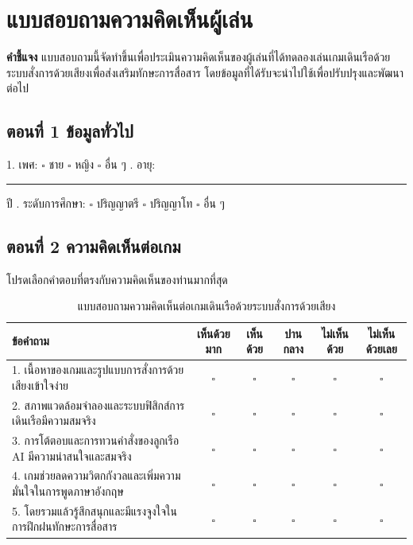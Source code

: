 
\setcounter{chapter}{-1}

\section*{แบบสอบถามความคิดเห็นผู้เล่น}

\textbf{คำชี้แจง} แบบสอบถามนี้จัดทำขึ้นเพื่อประเมินความคิดเห็นของผู้เล่นที่ได้ทดลองเล่นเกมเดินเรือด้วยระบบสั่งการด้วยเสียงเพื่อส่งเสริมทักษะการสื่อสาร โดยข้อมูลที่ได้รับจะนำไปใช้เพื่อปรับปรุงและพัฒนาต่อไป

\subsection*{ตอนที่ 1 ข้อมูลทั่วไป}
1. เพศ: $\square$ ชาย \quad $\square$ หญิง \quad $\square$ อื่น ๆ . อายุ: \rule{2cm}{0.4pt} ปี . ระดับการศึกษา: $\square$ ปริญญาตรี \quad $\square$ ปริญญาโท \quad $\square$ อื่น ๆ

\subsection*{ตอนที่ 2 ความคิดเห็นต่อเกม}
โปรดเลือกคำตอบที่ตรงกับความคิดเห็นของท่านมากที่สุด

\begin{table}[H]
\centering
\caption{แบบสอบถามความคิดเห็นต่อเกมเดินเรือด้วยระบบสั่งการด้วยเสียง}
\label{tab:survey_game}
\small
\begin{tabular}{|p{5cm}|c|c|c|c|c|}
\hline
\textbf{ข้อคำถาม} & \textbf{เห็นด้วยมาก} & \textbf{เห็นด้วย} & \textbf{ปานกลาง} & \textbf{ไม่เห็นด้วย} & \textbf{ไม่เห็นด้วยเลย} \\ \hline
1. เนื้อหาของเกมและรูปแบบการสั่งการด้วยเสียงเข้าใจง่าย & $\square$ & $\square$ & $\square$ & $\square$ & $\square$ \\ \hline
2. สภาพแวดล้อมจำลองและระบบฟิสิกส์การเดินเรือมีความสมจริง & $\square$ & $\square$ & $\square$ & $\square$ & $\square$ \\ \hline
3. การโต้ตอบและการทวนคำสั่งของลูกเรือ AI มีความน่าสนใจและสมจริง & $\square$ & $\square$ & $\square$ & $\square$ & $\square$ \\ \hline
4. เกมช่วยลดความวิตกกังวลและเพิ่มความมั่นใจในการพูดภาษาอังกฤษ & $\square$ & $\square$ & $\square$ & $\square$ & $\square$ \\ \hline
5. โดยรวมแล้วรู้สึกสนุกและมีแรงจูงใจในการฝึกฝนทักษะการสื่อสาร & $\square$ & $\square$ & $\square$ & $\square$ & $\square$ \\ \hline
\end{tabular}
\end{table}

